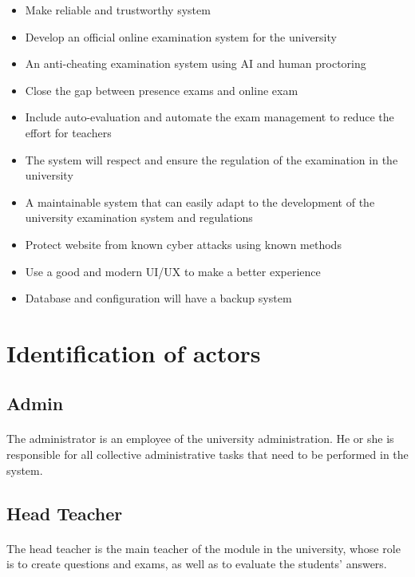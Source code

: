 \documentclass[]{uc2pfecaneva}
\begin{document}
    \begin{itemize}
        \item Make reliable and trustworthy system
        \item Develop an official online examination system for the university
        \item An anti-cheating examination system using  AI and human proctoring
        \item Close the gap between presence exams and online exam
        \item Include auto-evaluation and automate the exam management to reduce the effort for teachers
        \item The system will respect and ensure the regulation of the examination in the university
        \item A maintainable system that can easily adapt  to the development of the university examination system and regulations
        \item Protect website from known cyber attacks using known methods
        \item Use a good and modern UI/UX to make a better experience
        \item Database and configuration will have a backup system
    \end{itemize}

    \raggedright\section{Identification of actors}
    \raggedright\subsection{Admin}
    \paragraph{}
    The administrator is an employee of the university administration. He or she is responsible for all collective administrative tasks that need to be performed in the system.

    \raggedright\subsection{Head Teacher}
    \paragraph{}
    The head teacher is the main teacher of the module in the university, whose role is to create questions and exams, as well as to evaluate the students' answers.
\end{document}
